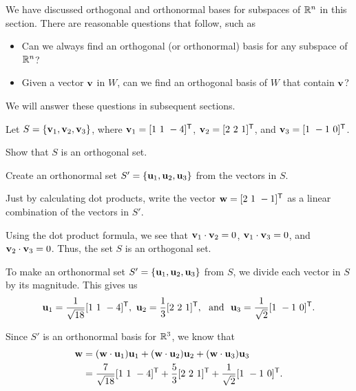 We have discussed orthogonal and orthonormal bases for subspaces of $\mathbb{R}^n$ in this section. There are reasonable questions that follow, such as
\begin{itemize}
\item Can we always find an orthogonal (or orthonormal) basis for any subspace of $\mathbb{R}^n$?
\item Given a vector $\mathbf{v}$ in $W$, can we find an orthogonal basis of $W$ that contain $\mathbf{v}$?

\end{itemize}
We will answer these questions in subsequent sections.


\ExampleIntro

\begin{example} Let $S = \{\mathbf{v}_1, \mathbf{v}_2, \mathbf{v}_3\}$, where $\mathbf{v}_1 = [1 \ 1 \ -4]^{\mathsf{T}}$, $\mathbf{v}_2 = [2 \ 2 \ 1]^{\mathsf{T}}$, and $\mathbf{v}_3 = [1 \ -1 \ 0]^{\mathsf{T}}$.
\ba
\item Show that $S$ is an orthogonal set.

\item Create an orthonormal set $S' = \{\mathbf{u}_1, \mathbf{u}_2, \mathbf{u}_3\}$ from the vectors in $S$. 

\item Just by calculating dot products, write the vector $\mathbf{w} = [2 \ 1 \ -1]^{\mathsf{T}}$ as a linear combination of the vectors in $S'$.  

\ea

\ExampleSolution

\ba
\item Using the dot product formula, we see that $\mathbf{v}_1 \cdot \mathbf{v}_2 = 0$, $\mathbf{v}_1 \cdot \mathbf{v}_3 = 0$, and $\mathbf{v}_2 \cdot \mathbf{v}_3 = 0$. Thus, the set $S$ is an orthogonal set. 

\item To make an orthonormal set $S' = \{\mathbf{u}_1, \mathbf{u}_2, \mathbf{u}_3\}$ from $S$, we divide each vector in $S$ by its magnitude. This gives us
\[\vu_1 = \frac{1}{\sqrt{18}}[1 \ 1 \ -4]^{\tr}, \ \vu_2 = \frac{1}{3}[2 \ 2 \ 1]^{\tr}, \ \text{ and } \ \vu_3 = \frac{1}{\sqrt{2}} [1 \ -1 \ 0]^{\tr}.\]

\item Since $S'$ is an orthonormal basis for $\mathbb{R}^3$, we know that
\begin{align*}
\vw &= (\vw \cdot \vu_1) \vu_1 + (\vw \cdot \vu_2) \vu_2 + (\vw \cdot \vu_3) \vu_3  \\
	&= \frac{7}{\sqrt{18}}[1 \ 1 \ -4]^{\tr} +  \frac{5}{3}[2 \ 2 \ 1]^{\tr} + \frac{1}{\sqrt{2}}[1 \ -1 \ 0]^{\tr}.
\end{align*}

\ea

\end{example}

